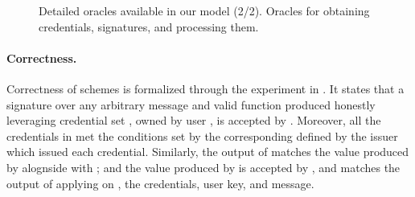 {\begin{figure*}[htp!]
{\begin{minipage}[t]{.5\textwidth}
        \procedure{$\SIGN(\oid,\uid,\scid,\msg,\feval)$}{%
          \pcif \uid \notin \HU: \pcreturn \bot \\
          (\sig,\yeval) \gets \Sign(\PRVUK[\uid],\PUBOK[\oid],\CRED[\scid],\msg,
          \feval) \\
          \SIG[\uid] \gets \SIG[\uid] \cup
          \lbrace (\oid,\scid,\sig,\yeval,\msg,\feval) \rbrace \\
          \pcreturn \sig \\
        }                

        
      \end{minipage}
      
    }

    \caption{Detailed oracles available in our model (2/2). Oracles for
      obtaining credentials, signatures, and processing them.}
    \label{fig:oracles2}
  \end{figure*}
}

\paragraph{Correctness.} %
Correctness of \UAS schemes is formalized through the experiment in
. It states that a signature over any arbitrary message
and valid function \feval produced honestly leveraging credential set \scid,
owned by user \uid, is accepted by \Verify. Moreover, all the credentials in
\scid met the conditions set by the corresponding \fissue defined by the issuer
which issued each credential. Similarly, the output \yeval of \feval matches the
value produced by \Sign alognside with \sig; and the value produced by \Inspect
is accepted by \Judge, and matches the output of applying \finsp on \yeval, the
credentials, user key, and message.

